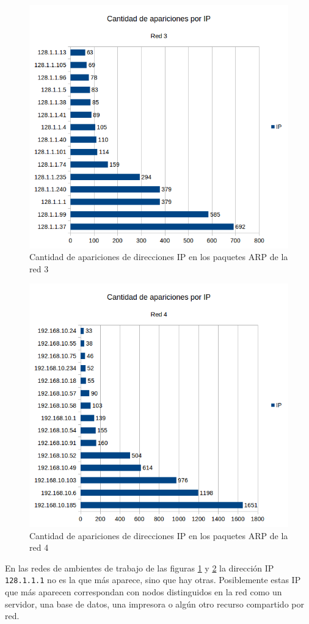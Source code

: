 \begin{figure}[H]
	\centering
	\includegraphics[scale=0.65]{imgs/red3_identificar.png}
	\caption{Cantidad de apariciones de direcciones IP en los paquetes ARP de la red 3}
      \label{red3_identificar}
\end{figure}

\begin{figure}[H]
	\centering
	\includegraphics[scale=0.65]{imgs/red4_identificar.png}
	\caption{Cantidad de apariciones de direcciones IP en los paquetes ARP de la red 4}
      \label{red4_identificar}
\end{figure}

En las redes de ambientes de trabajo de las figuras \ref{red3_identificar} y \ref{red4_identificar} la dirección IP \texttt{128.1.1.1} no es la que más aparece, sino que hay otras. Posiblemente estas IP que más aparecen correspondan con nodos distinguidos en la red como un servidor, una base de datos, una impresora o algún otro recurso compartido por red.